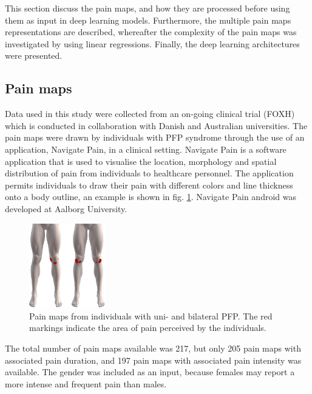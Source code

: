This section discuss the pain maps, and how they are processed before using them as input in deep learning models. Furthermore, the multiple pain maps representations are described, whereafter the complexity of the pain maps was investigated by using linear regressions. Finally, the deep learning architectures were presented.

\subsection*{\textbf{Pain maps}}
Data used in this study were collected from an on-going clinical trial (FOXH) which is conducted in collaboration with Danish and Australian universities. The pain maps were drawn by individuals with PFP syndrome through the use of an application, Navigate Pain, in a clinical setting. \newline
\noindent
Navigate Pain is a software application that is used to visualise the location, morphology and spatial distribution of pain from individuals to healthcare personnel. The application permits individuals to draw their pain with different colors and line thickness onto a body outline, an example is shown in fig. \ref{fig:twoPainmaps}. Navigate Pain android was developed at Aalborg University.\citep{Solutions2015}

\begin{figure}[H]
\centering
\includegraphics[width=0.3\textwidth]{Figures/twoPainmaps}
\caption{Pain maps from individuals with uni- and bilateral PFP. The red markings indicate the area of pain perceived by the individuals.}
\label{fig:twoPainmaps}
\end{figure}

\noindent
The total number of pain maps available was 217, but only 205 pain maps with associated pain duration, and 197 pain maps with associated pain intensity was available. The gender was included as an input, because females may report a more intense and frequent pain than males. 


